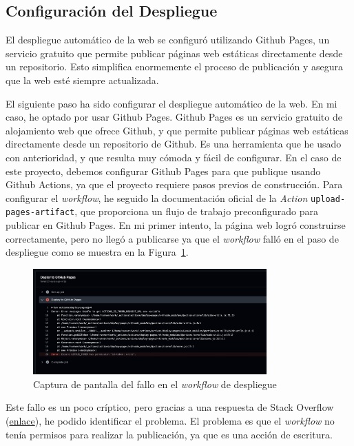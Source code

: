 \documentclass{article}
\begin{document}
\subsection{Configuración del Despliegue}\label{subsec:configuracion-del-despliegue}

El despliegue automático de la web se configuró utilizando Github Pages, un servicio gratuito que permite publicar páginas web estáticas directamente desde un repositorio. Esto simplifica enormemente el proceso de publicación y asegura que la web esté siempre actualizada.

El siguiente paso ha sido configurar el despliegue automático de la web. En mi caso, he optado por usar Github Pages. Github Pages es un servicio gratuito de alojamiento web que ofrece Github, y que permite publicar páginas web estáticas directamente desde un repositorio de Github. Es una herramienta que he usado con anterioridad, y que resulta muy cómoda y fácil de configurar. En el caso de este proyecto, debemos configurar Github Pages para que publique usando Github Actions, ya que el proyecto requiere pasos previos de construcción. Para configurar el \textit{workflow}, he seguido la documentación oficial de la \textit{Action} \texttt{upload-pages-artifact}, que proporciona un flujo de trabajo preconfigurado para publicar en Github Pages. En mi primer intento, la página web logró construirse correctamente, pero no llegó a publicarse ya que el \textit{workflow} falló en el paso de despliegue como se muestra en la Figura~\ref{fig:workflow-fail}.

\begin{figure}[h!]
    \centering
    \includegraphics[width=0.8\textwidth]{./img/workflow-failed}
    \caption{Captura de pantalla del fallo en el \textit{workflow} de despliegue}
    \label{fig:workflow-fail}
\end{figure}

Este fallo es un poco críptico, pero gracias a una respuesta de Stack Overflow (\href{https://stackoverflow.com/a/74167257}{enlace}), he podido identificar el problema. El problema es que el \textit{workflow} no tenía permisos para realizar la publicación, ya que es una acción de escritura.
\end{document}
